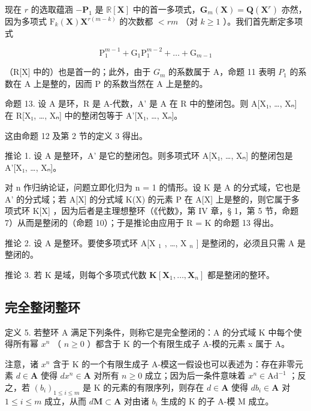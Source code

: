 现在 \(r\) 的选取蕴涵 \(-\mathbf{P}_1\) 是 \(\mathbb{R}[\mathbf{X}]\) 中的首一多项式，\(\mathbf{G}_m(\mathbf{X}) = \mathbf{Q}(\mathbf{X}^r)\) 亦然，因为多项式 \(\mathrm{F}_k(\mathbf{X})\mathbf{X}^{r(m - k)}\) 的次数都 \(< rm\) （对 \(k \geqslant 1\) ）。我们首先断定多项式

\[
\mathrm{P} _ {1} ^ {m - 1} + \mathrm{G} _ {1} \mathrm{P} _ {1} ^ {m - 2} + \dots + \mathrm{G} _ {m - 1}
\]

（R{[}X{]} 中的）也是首一的；此外，由于 \(G_{m}\) 的系数属于 A，命题 11 表明 \(P_{1}\) 的系数在 A 上是整的，因而 P 的系数当然在 A 上是整的。

命题 13. 设 A 是环，R 是 A-代数，A' 是 A 在 R 中的整闭包。则 A{[}X₁, \ldots, Xₙ{]} 在 R{[}X₁, \ldots, Xₙ{]} 中的整闭包等于 A'{[}X₁, \ldots, Xₙ{]}。

这由命题 12 及第 2 节的定义 3 得出。

推论 1. 设 A 是整环，A' 是它的整闭包。则多项式环 A{[}X₁, \ldots, Xₙ{]} 的整闭包是 A'{[}X₁, \ldots, Xₙ{]}。

对 n 作归纳论证，问题立即化归为 n = 1 的情形。设 K 是 A 的分式域，它也是 A' 的分式域；若 A{[}X{]} 的分式域 K(X) 的元素 P 在 A{[}X{]} 上是整的，则它属于多项式环 K{[}X{]} ，因为后者是主理想整环（《代数》，第 IV 章，§ 1，第 5 节，命题 7）从而是整闭的（命题 10）；于是推论由应用于 R = K 的命题 13 得出。

推论 2. 设 A 是整环。要使多项式环 A{[}X \(_{1}\) , \ldots, X \(_{n}\) {]} 是整闭的，必须且只需 A 是整闭的。

推论 3. 若 K 是域，则每个多项式代数 \(\mathbf{K}[\mathbf{X}_1,\ldots ,\mathbf{X}_n]\) 都是整闭的整环。

\subsection{完全整闭整环}

定义 5. 若整环 A 满足下列条件，则称它是完全整闭的：A 的分式域 K 中每个使得所有幂 \(x^{n}\) （ \(n \geqslant 0\) ）都含于 K 的一个有限生成子 A-模的元素 x 属于 A。

注意，诸 \(x^n\) 含于 K 的一个有限生成子 A-模这一假设也可以表述为：存在非零元素 \(d \in \mathbf{A}\) 使得 \(dx^n \in \mathbf{A}\) 对所有 \(n \geqslant 0\) 成立；因为后一条件意味着 \(x^n \in \mathrm{Ad}^{-1}\) ；反之，若 \((b_i)_{1 \leqslant i \leqslant m}\) 是 K 的元素的有限序列，则存在 \(d \in \mathbf{A}\) 使得 \(db_i \in \mathbf{A}\) 对 \(1 \leqslant i \leqslant m\) 成立，从而 \(d\mathbf{M} \subset \mathbf{A}\) 对由诸 \(b_i\) 生成的 K 的子 A-模 M 成立。

